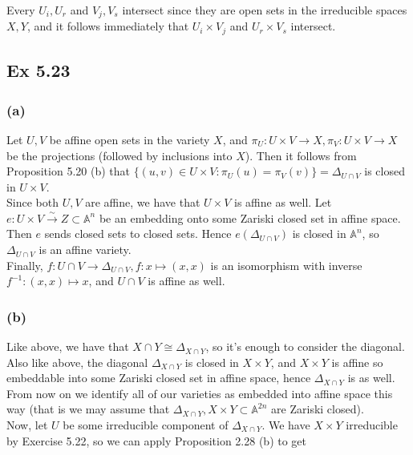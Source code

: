 \documentclass{article}
\theoremstyle{definition}
\newcommand{\A}{\mathbb{A}}
\renewcommand{\AA}[1]{\A^{#1}}
\newcommand{\An}{\A^n}
\begin{document}
Every $U_i, U_r$ and $V_j, V_s$ intersect since they are open sets in the
irreducible spaces $X, Y$, and it follows immediately that $U_i \times V_j$ and
$U_r \times V_s$ intersect. 

\subsection*{Ex 5.23} 

\subsubsection*{(a)} 

Let $U, V$ be affine open sets in the variety $X$, and $\pi_U : U \times V \to
X, \pi_V : U \times V \to X$ be the projections (followed by inclusions into
$X$). Then it follows from Proposition 5.20 (b) that $\{(u, v) \in U \times V:
\pi_U(u) = \pi_V(v)\} = \Delta_{U \cap V}$ is closed in $U \times V$. \\

Since both $U, V$ are affine, we have that $U \times V$ is affine as well. Let
$e : U \times V \xrightarrow{\sim} Z \subset \An$ be an embedding onto some
Zariski closed set in affine space. Then $e$ sends closed sets to closed sets.
Hence $e(\Delta_{U \cap V})$ is closed in $\An$, so $\Delta_{U \cap V}$ is an
affine variety. \\

Finally, $f : U \cap V \to \Delta_{U \cap V} , f : x \mapsto (x, x)$ is an
isomorphism with inverse $f^{-1} : (x, x) \mapsto x$, and $U \cap V$ is affine
as well.

\subsubsection*{(b)} 

Like above, we have that $X \cap Y \cong \Delta_{X \cap Y}$, so it's enough to
consider the diagonal. Also like above, the diagonal $\Delta_{X \cap Y}$ is
closed in $X \times Y$, and $X \times Y$ is affine so embeddable into some
Zariski closed set in affine space, hence $\Delta_{X \cap Y}$ is as well. From
now on we identify all of our varieties as embedded into affine space this way
(that is we may assume that $\Delta_{X \cap Y}, X \times Y \subset \AA{2n}$ are
Zariski closed). \\

Now, let $U$ be some irreducible component of $\Delta_{X \cap Y}$. We have $X
\times Y$ irreducible by Exercise 5.22, so we can apply Proposition 2.28 (b) to
get
\end{document}
